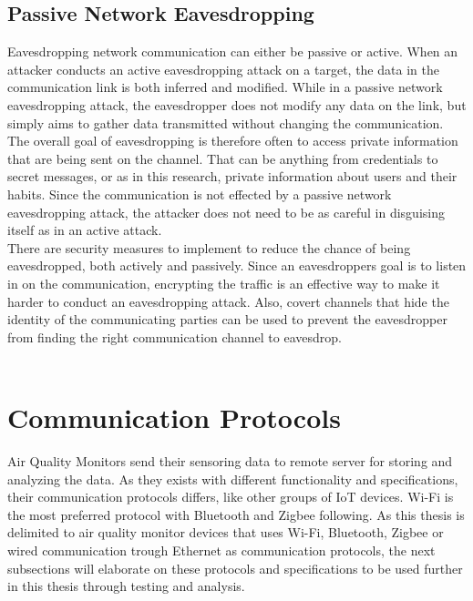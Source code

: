 \subsection*{Passive Network Eavesdropping}
Eavesdropping network communication can either be passive or active. When an attacker conducts an active eavesdropping attack on a target, the data in the communication link is both inferred and modified. \cite{Eavesdropping} While in a passive network eavesdropping attack, the eavesdropper does not modify any data on the link, but simply aims to gather data transmitted without changing the communication. The overall goal of eavesdropping is therefore often to access private information that are being sent on the channel. That can be anything from credentials to secret messages, or as in this research, private information about users and their habits. \cite{Eavesdropping} Since the communication is not effected by a passive network eavesdropping attack, the attacker does not need to be as careful in disguising itself as in an active attack.  
\\
There are security measures to implement to reduce the chance of being eavesdropped, both actively and passively. Since an eavesdroppers goal is to listen in on the communication, encrypting the traffic is an effective way to make it harder to conduct an eavesdropping attack. Also, covert channels that hide the identity of the communicating parties can be used to prevent the eavesdropper from finding the right communication channel to eavesdrop. \cite{Eavesdropping}
\\\\
\section*{Communication Protocols}
Air Quality Monitors send their sensoring data to remote server for storing and analyzing the data. As they exists with different functionality and specifications, their communication protocols differs, like other groups of IoT devices. \cite{AQMBigSource} Wi-Fi is the most preferred protocol with Bluetooth and Zigbee following. \cite{saini2020indoor} As this thesis is delimited to air quality monitor devices that uses Wi-Fi, Bluetooth, Zigbee or wired communication trough Ethernet as communication protocols, the next subsections will elaborate on these protocols and specifications to be used further in this thesis through testing and analysis. 

